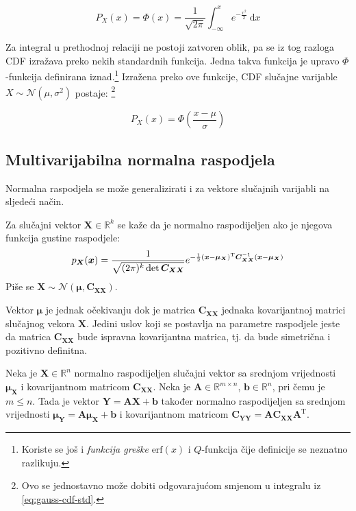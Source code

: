 \begin{equation} \label{eq:gauss-cdf-std}
  P_X(x) = \Phi(x)
  = \frac{1}{\sqrt{2\pi}} \int_{-\infty}^{x} e^{-\frac{x^2}{2}} \ \mathrm dx
\end{equation}

Za integral u prethodnoj relaciji ne postoji zatvoren oblik, pa se iz tog
razloga CDF izražava preko nekih standardnih funkcija. Jedna takva funkcija je
upravo $\Phi$-funkcija definirana iznad.\footnote{Koriste se još i
  \textit{funkcija greške} $\mathrm{erf}(x)$ i $Q$-funkcija čije definicije se
  neznatno razlikuju.} Izražena preko ove funkcije, CDF slučajne varijable $X
  \sim \mathcal{N}(\mu, \sigma^2)$ postaje: \footnote{Ovo se jednostavno može
    dobiti odgovarajućom smjenom u integralu iz \ref{eq:gauss-cdf-std}.}

\begin{equation}
  P_X(x) = \Phi\left(\frac{x-\mu}{\sigma}\right)
\end{equation}

\subsection{Multivarijabilna normalna raspodjela} \label{sec:gauss-multi}

Normalna raspodjela se može generalizirati i za vektore slučajnih varijabli na
sljedeći način.

\begin{definition}

  Za slučajni vektor $\bm X \in \mathbb{R}^k$ se kaže da je normalno
  raspodijeljen ako je njegova funkcija gustine raspodjele:
  \begin{equation}
    p_{\bm X}(\bm x) 
    = \frac{1}{\sqrt{(2\pi)^k \det \bm C_{\bm X \bm X}}} e^{ -\frac{1}{2}(\bm x -
      \bm\mu_{\bm X})^\text T \bm C_{\bm X \bm X}^{-1} (\bm x - \bm\mu_{\bm X}) }
  \end{equation}
  Piše se $\bm X \sim \mathcal{N}(\bm\mu, \bm C_{\bm X\bm X})$.

\end{definition}

Vektor $\bm\mu$ je jednak očekivanju dok je matrica $\bm C_{\bm X\bm X}$
jednaka kovarijantnoj matrici slučajnog vekora $\bm X$.  Jedini uslov koji se
postavlja na parametre raspodjele jeste da matrica $\bm C_{\bm X\bm X}$ bude
ispravna kovarijantna matrica, tj. da bude simetrična i pozitivno definitna. 

\begin{theorem}
	\label{th:lin-tr-gauss}
	Neka je $\bm X \in \mathbb{R}^n$ normalno raspodijeljen slučajni vektor sa
	srednjom vrijednosti $\bm\mu_{\bm X}$ i kovarijantnom matricom $\bm C_{\bm
	X\bm X}$. Neka je $\bm A \in \mathbb{R}^{m\times n}$, $\bm b \in
	\mathbb{R}^n$, pri čemu je $m\le n$. Tada je vektor $\bm Y = \bm A \bm X + \bm
	b$ također normalno raspodijeljen sa srednjom vrijednosti $\bm\mu_{\bm Y} =
	\bm A\bm\mu_{\bm X} + \bm b$ i kovarijantnom matricom $\bm C_{\bm Y\bm Y} =
	\bm A \bm C_{\bm X\bm X} \bm A^\mathrm T$.

\end{theorem}

